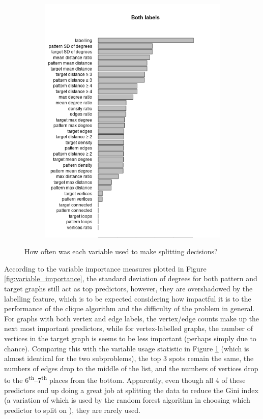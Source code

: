 \documentclass{l4proj}
\theoremstyle{definition}
\theoremstyle{remark}
\begin{document}
\begin{figure}
\begin{subfigure}[t]{0.49\textwidth}
    \includegraphics[width=\textwidth]{images/both_labels_var_used.png}
  \end{subfigure}
  \caption{How often was each variable used to make splitting decisions?}
  \label{fig:var_used}
\end{figure}

According to the variable importance measures plotted in Figure
\ref{fig:variable_importance}, the standard deviation of degrees for
both pattern and target graphs still act as top predictors, however, they are
overshadowed by the labelling feature, which is to be expected considering how
impactful it is to the performance of the clique algorithm and the difficulty of
the problem in general. For graphs with both vertex and edge labels, the
vertex/edge counts make up the next most important predictors, while for
vertex-labelled graphs, the number of vertices in the target graph is seems to
be less important (perhaps simply due to chance). Comparing this with the
variable usage statistic in Figure \ref{fig:var_used} (which is almost identical
for the two subproblems), the top 3 spots remain the same, the numbers of
edges drop to the middle of the list, and the numbers of vertices drop to the
6\textsuperscript{th}--7\textsuperscript{th} places from the bottom. Apparently,
even though all 4 of these predictors end up doing a great job at splitting the
data to reduce the Gini index (a variation of which is used by the random forest
algorithm in choosing which predictor to split on \cite{167153}), they are
rarely used.
\end{document}
